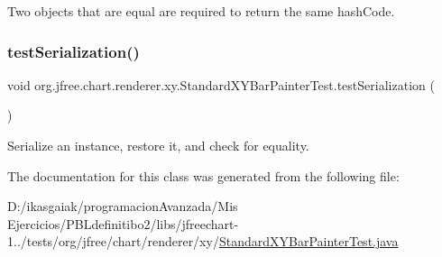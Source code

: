 Two objects that are equal are required to return the same hash\+Code. \mbox{\label{classorg_1_1jfree_1_1chart_1_1renderer_1_1xy_1_1_standard_x_y_bar_painter_test_a14de78d9d96483ac34389bbb361e86cd}} 
\subsubsection{\texorpdfstring{test\+Serialization()}{testSerialization()}}
{\footnotesize\ttfamily void org.\+jfree.\+chart.\+renderer.\+xy.\+Standard\+X\+Y\+Bar\+Painter\+Test.\+test\+Serialization (\begin{DoxyParamCaption}{ }\end{DoxyParamCaption})}

Serialize an instance, restore it, and check for equality. 

The documentation for this class was generated from the following file\+:\begin{DoxyCompactItemize}
\item 
D\+:/ikasgaiak/programacion\+Avanzada/\+Mis Ejercicios/\+P\+B\+Ldefinitibo2/libs/jfreechart-\/1../tests/org/jfree/chart/renderer/xy/\mbox{\hyperlink{_standard_x_y_bar_painter_test_8java}{Standard\+X\+Y\+Bar\+Painter\+Test.\+java}}\end{DoxyCompactItemize}
